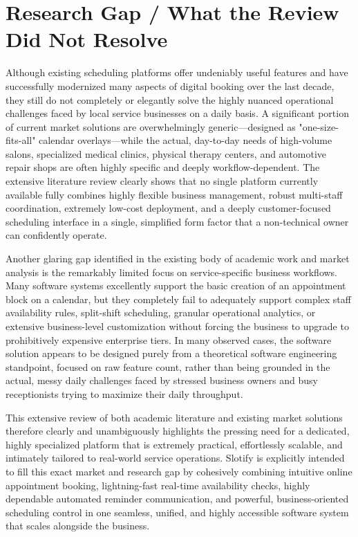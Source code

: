 \section{Research Gap / What the Review Did Not Resolve}
Although existing scheduling platforms offer undeniably useful features and have successfully modernized many aspects of digital booking over the last decade, they still do not completely or elegantly solve the highly nuanced operational challenges faced by local service businesses on a daily basis. A significant portion of current market solutions are overwhelmingly generic—designed as "one-size-fits-all" calendar overlays—while the actual, day-to-day needs of high-volume salons, specialized medical clinics, physical therapy centers, and automotive repair shops are often highly specific and deeply workflow-dependent. The extensive literature review clearly shows that no single platform currently available fully combines highly flexible business management, robust multi-staff coordination, extremely low-cost deployment, and a deeply customer-focused scheduling interface in a single, simplified form factor that a non-technical owner can confidently operate.

Another glaring gap identified in the existing body of academic work and market analysis is the remarkably limited focus on service-specific business workflows. Many software systems excellently support the basic creation of an appointment block on a calendar, but they completely fail to adequately support complex staff availability rules, split-shift scheduling, granular operational analytics, or extensive business-level customization without forcing the business to upgrade to prohibitively expensive enterprise tiers. In many observed cases, the software solution appears to be designed purely from a theoretical software engineering standpoint, focused on raw feature count, rather than being grounded in the actual, messy daily challenges faced by stressed business owners and busy receptionists trying to maximize their daily throughput.

This extensive review of both academic literature and existing market solutions therefore clearly and unambiguously highlights the pressing need for a dedicated, highly specialized platform that is extremely practical, effortlessly scalable, and intimately tailored to real-world service operations. Slotify is explicitly intended to fill this exact market and research gap by cohesively combining intuitive online appointment booking, lightning-fast real-time availability checks, highly dependable automated reminder communication, and powerful, business-oriented scheduling control in one seamless, unified, and highly accessible software system that scales alongside the business.
